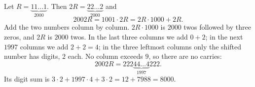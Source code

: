 Let $R=\underbrace{11\ldots1}_{2000}$. Then $2R=\underbrace{22\ldots2}_{2000}$ and
\[
2002R=1001\cdot2R=2R\cdot1000+2R .
\]
Add the two numbers column by column. $2R\cdot1000$ is $2000$ twos followed by three zeros, and $2R$ is $2000$ twos. In the last three columns we add $0+2$; in the next $1997$ columns we add $2+2=4$; in the three leftmost columns only the shifted number has digits, $2$ each. No column exceeds $9$, so there are no carries:
\[
2002R=222\underbrace{44\ldots4}_{1997}222 .
\]
Its digit sum is $3\cdot2+1997\cdot4+3\cdot2=12+7988=\boxed{8000}$.
